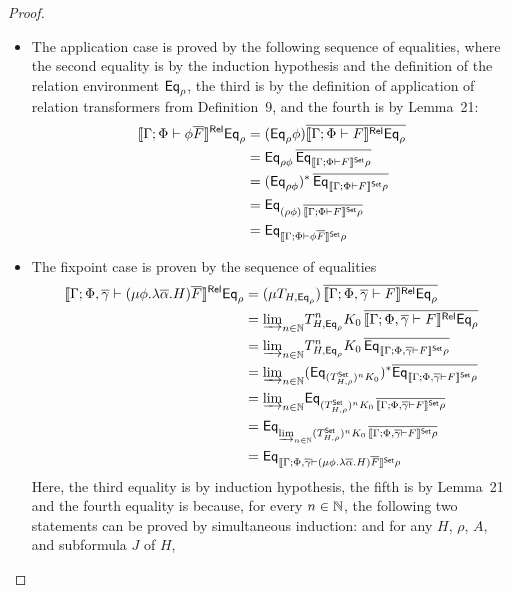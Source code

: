 \documentclass[acmsmall,review,anonymous]{acmart}
\theoremstyle{definition}
\newcommand{\set}{\mathsf{Set}}
\begin{document}
\begin{proof}
\begin{itemize}
\item The application case is proved by the following sequence of
  equalities, where the second equality is by the induction hypothesis
  and the definition of the relation environment $\mathsf{Eq}_\rho$, the third
  is by the definition of application of relation transformers from
  Definition~9, and the fourth is by
  Lemma~21:
\[
\begin{split}
\relsem{\Gamma; \Phi \vdash \phi\ol{F}}\Eq_{\rho} &=
(\Eq_{\rho}\phi)\ol{\relsem{\Gamma; \Phi \vdash F}
\Eq_{\rho}}\\
&= \Eq_{\rho \phi}\, \ol{\Eq_{\setsem{\Gamma; \Phi \vdash F}
  \rho}}\\
&= (\Eq_{\rho \phi})^* \,\ol{\Eq_{\setsem{\Gamma; \Phi \vdash F}
  \rho}}\\
&= \Eq_{(\rho \phi) \,\ol{\setsem{\Gamma; \Phi \vdash F} \rho}}\\
&= \Eq_{\setsem{\Gamma; \Phi \vdash \phi\ol{F}}\rho}
\end{split}
\]
\item 
  The fixpoint case is proven by the sequence of equalities
\[
\begin{split}
\relsem{\Gamma; \Phi, \ol\gamma \vdash (\mu \phi.\lambda
  \ol{\alpha}. H)\ol{F}}\Eq_{\rho} 
&=(\mu {T_{H, \Eq_{\rho}}}) \,\ol{\relsem{\Gamma; \Phi, \ol\gamma  \vdash F}\Eq_{\rho}}\\ 
&= \colim{n \in \nat}{T^n_{H, \Eq_{\rho}} K_0}\, \ol{\relsem{\Gamma; \Phi, \ol\gamma 
  \vdash F}\Eq_{\rho}}\\
&= \colim{n \in \nat}{ T^n_{H, \Eq_{\rho}} K_0 \,\ol{\Eq_{\setsem{\Gamma;
    \Phi, \ol\gamma  \vdash F}\rho}}}\\
&= \colim{n \in \nat}{(\Eq_{(T^\set_{H,\rho})^n K_0})^*
  \ol{\Eq_{\setsem{\Gamma; \Phi, \ol\gamma  \vdash F}\rho}}}\\
&= \colim{n \in \nat}{\Eq_{(T^\set_{H,\rho})^n K_0 \,\ol{\setsem{\Gamma;
        \Phi, \ol\gamma  \vdash F}\rho}}}\\ 
&= \Eq_{\colim{n \in \nat}{ (T^\set_{H,\rho})^n K_0\,
    \ol{\setsem{\Gamma; \Phi, \ol\gamma  \vdash F}\rho}}}\\
&= \Eq_{\setsem{\Gamma; \Phi, \ol\gamma  \vdash (\mu \phi.\lambda
      \ol{\alpha}. H)\ol{F}}\rho}
\end{split}
\]
Here, the third equality is by induction hypothesis, the fifth is by
Lemma~21 and the fourth equality is because, for every $n \in \mathbb{N}$,
the following two statements can be proved by simultaneous induction:
and for any $H$, $\rho$, $A$, and subformula $J$ of $H$,

\end{itemize}
\end{proof}
\end{document}
